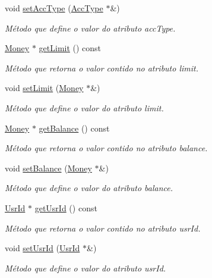 \begin{DoxyCompactItemize}
void \hyperlink{classAccount_a591f46705d2d55a8280361a2b858f98e}{set\-Acc\-Type} (\hyperlink{classUsrType}{Acc\-Type} $\ast$\&)
\begin{DoxyCompactList}\small\item\em Método que define o valor do atributo acc\-Type. \end{DoxyCompactList}\item 
\hyperlink{classMoney}{Money} $\ast$ \hyperlink{classAccount_a84bf19da9a4396e36636ae8a4019e693}{get\-Limit} () const 
\begin{DoxyCompactList}\small\item\em Método que retorna o valor contido no atributo limit. \end{DoxyCompactList}\item 
void \hyperlink{classAccount_a33080c70a26c57cdf95b3628cf384122}{set\-Limit} (\hyperlink{classMoney}{Money} $\ast$\&)
\begin{DoxyCompactList}\small\item\em Método que define o valor do atributo limit. \end{DoxyCompactList}\item 
\hyperlink{classMoney}{Money} $\ast$ \hyperlink{classAccount_a6088631fd77c97f43ac6e17591ab59de}{get\-Balance} () const 
\begin{DoxyCompactList}\small\item\em Método que retorna o valor contido no atributo balance. \end{DoxyCompactList}\item 
void \hyperlink{classAccount_a25653562371b50021ec71f9eb2860ec2}{set\-Balance} (\hyperlink{classMoney}{Money} $\ast$\&)
\begin{DoxyCompactList}\small\item\em Método que define o valor do atributo balance. \end{DoxyCompactList}\item 
\hyperlink{classUsrId}{Usr\-Id} $\ast$ \hyperlink{classAccount_a5c8e591c08c9877a5d331515f3df47a5}{get\-Usr\-Id} () const 
\begin{DoxyCompactList}\small\item\em Método que retorna o valor contido no atributo usr\-Id. \end{DoxyCompactList}\item 
void \hyperlink{classAccount_a758021a83fd9b1576c8c42a70a47986d}{set\-Usr\-Id} (\hyperlink{classUsrId}{Usr\-Id} $\ast$\&)
\begin{DoxyCompactList}\small\item\em Método que define o valor do atributo usr\-Id. \end{DoxyCompactList}\end{DoxyCompactItemize}


